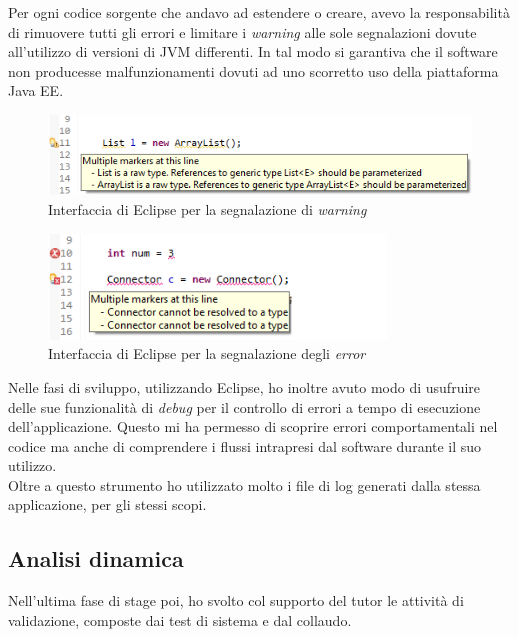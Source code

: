 	Per ogni codice sorgente che andavo ad estendere o creare, avevo la responsabilità di rimuovere tutti gli errori e limitare i \textit{warning} alle sole segnalazioni dovute all'utilizzo di versioni di JVM differenti. In tal modo si garantiva che il software non producesse malfunzionamenti dovuti ad uno scorretto uso della piattaforma Java EE.\\
	
	\begin{figure}[H]
		\centering
	   	\includegraphics[width=1\textwidth]{immagini/warning_eclipse}
	   	\caption{Interfaccia di Eclipse per la segnalazione di \textit{warning}}
	\end{figure}
	
	\vspace{5mm}
	
	\begin{figure}[H]
		\centering
	   	\includegraphics[width=0.8\textwidth]{immagini/error_eclipse}
	   	\caption{Interfaccia di Eclipse per la segnalazione degli \textit{error}}
	\end{figure}
	
		\vspace{5mm}	
	
	Nelle fasi di sviluppo, utilizzando Eclipse, ho inoltre avuto modo di usufruire delle sue funzionalità di \textit{debug} per il controllo di errori a tempo di esecuzione dell'applicazione. Questo mi ha permesso di scoprire errori comportamentali nel codice ma anche di comprendere i flussi intrapresi dal software durante il suo utilizzo.\\
	
	Oltre a questo strumento ho utilizzato molto i file di log generati dalla stessa applicazione, per gli stessi scopi.
	
	\subsection{Analisi dinamica}
	Nell'ultima fase di stage poi, ho svolto col supporto del tutor le attività di validazione, composte dai test di sistema e dal collaudo.
	
